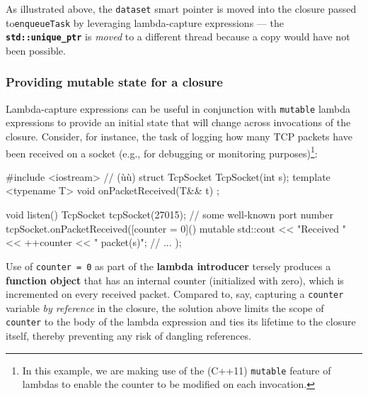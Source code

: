 \noindent As illustrated above, the \texttt{dataset} smart pointer is moved into
the closure passed to\linebreak[4] \mbox{\texttt{enqueueTask}} by leveraging lambda-capture
expressions --- the \textbf{\texttt{std::unique\_ptr}} is \emph{moved}
to a different thread because a copy would have not been possible.

\subsubsection[Providing mutable state for a closure]{Providing mutable state for a closure}\label{providing-mutable-state-for-a-closure}

Lambda-capture expressions can be useful in conjunction with
\texttt{mutable} lambda expressions to provide an initial state that
will change across invocations of the closure. Consider, for instance,
the task of logging how many TCP packets have been received on a socket
(e.g., for debugging or monitoring purposes){\cprotect\footnote{In
this example, we are making use of the (C++11) \texttt{mutable} feature
  of lambdas to enable the counter to be modified on each invocation.}}:

\begin{emcppshiddenlisting}[emcppsbatch=e2]
#include <iostream>  // (ù{}ù)
struct TcpSocket {
    TcpSocket(int s);
    template <typename T>
    void onPacketReceived(T&& t) {}
};

\end{emcppshiddenlisting}
\begin{emcppslisting}[emcppsbatch=e2,emcppsstandards={c++14}]
void listen()
{
    TcpSocket tcpSocket(27015);  // some well-known port number
    tcpSocket.onPacketReceived([counter = 0]() mutable
    {
        std::cout << "Received " << ++counter << " packet(s)\n";
        // ...
    });
}
\end{emcppslisting}
    
\noindent Use of \texttt{counter}~\texttt{=}~\texttt{0} as part of the
\textbf{lambda introducer} tersely produces a \textbf{function object}
that has an internal counter (initialized with zero), which is
incremented on every received packet. Compared to, say, capturing a
\texttt{counter} variable \textit{by reference} in the closure, the solution
above limits the scope of \texttt{counter} to the body of the lambda
expression and ties its lifetime to the closure itself, thereby
preventing any risk of dangling references.

